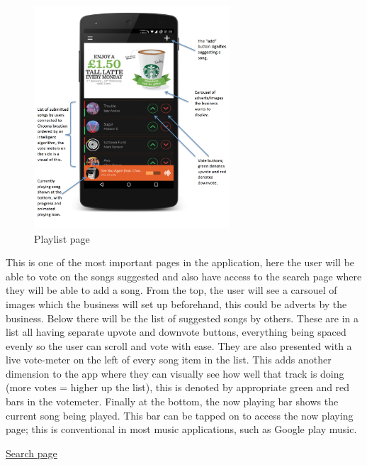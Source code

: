 \noindent
\begin{figure}[h!]
\centering
\includegraphics[width=0.65\textwidth]{./img/playlistannotated.png}
\caption{Playlist page}
\label{fig:playlist}
\end{figure}

This is one of the most important pages in the application, here the user will be able to vote on the songs suggested and also have access to the search page where they will be able to add a song. From the top, the user will see a carsouel of images which the business will set up beforehand, this could be adverts by the business. Below there will be the list of suggested songs by others. These are in a list all having separate upvote and downvote buttons, everything being spaced evenly so the user can scroll and vote with ease. They are also presented with a live vote-meter on the left of every song item in the list. This adds another dimension to the app where they can visually see how well that track is doing (more votes = higher up the list), this is denoted by appropriate green and red bars in the votemeter. Finally at the bottom, the now playing bar shows the current song being played. This bar can be tapped on to access the now playing page; this is conventional in most music applications, such as Google play music.

\clearpage


\noindent\underline{Search page}\newline

